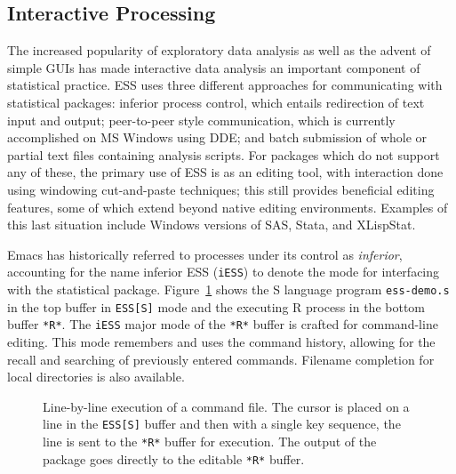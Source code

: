 \documentclass{article}
\newcommand{\stexttt}[1]{{\small\texttt{#1}}}
\begin{document}
\subsection{Interactive Processing}
\label{sec:interactive}

The increased popularity of exploratory data analysis as well as the
advent of simple GUIs has made interactive data analysis an important
component of statistical practice.  ESS uses three different
approaches for communicating with statistical packages: inferior
process control, which entails redirection of text input and output;
peer-to-peer style communication, which is currently accomplished on
MS Windows using DDE; and batch submission of whole or partial text
files containing analysis scripts.  For packages which do not support
any of these, the primary use of ESS is as an editing tool, with
interaction done using windowing cut-and-paste techniques; this still
provides beneficial editing features, some of which extend beyond
native editing environments.  Examples of this last situation include
Windows versions of SAS, Stata, and XLispStat.

Emacs has historically referred to processes under its control as
\textit{inferior}, accounting for the name inferior ESS
(\stexttt{iESS}) to denote the mode for interfacing with the
statistical package.  Figure~\ref{fig:ess-demo} shows the S language
program \stexttt{ess-demo.s} in the top buffer in \stexttt{ESS[S]}
mode and the executing R process in the bottom buffer \stexttt{*R*}.
The \stexttt{iESS} major mode of the \stexttt{*R*} buffer is crafted
for command-line editing.  This mode remembers and uses the command
history, allowing for the recall and searching of previously entered
commands.  Filename completion for local directories is also
available.


\begin{figure}[tb]
  \caption{Line-by-line execution of a command file. The cursor is
    placed on a line in the \stexttt{ESS[S]} buffer and then with a
    single key sequence, the line is sent to the \stexttt{*R*} buffer
    for execution.  The output of the package goes directly to the
    editable \stexttt{*R*} buffer.}
  \label{fig:ess-demo}
\end{figure}
\end{document}

